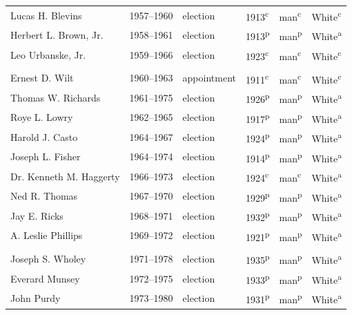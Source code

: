 \begin{longtable}{Q}
Lucas H. Blevins & 1957--1960 & election & 1913\textsuperscript{c} & man\textsuperscript{c} & White\textsuperscript{c} \\
Herbert L. Brown, Jr. & 1958--1961 & election & 1913\textsuperscript{p} & man\textsuperscript{p} & White\textsuperscript{a} \\*
Leo Urbanske, Jr. & 1959--1966 & election & 1923\textsuperscript{c} & man\textsuperscript{c} & White\textsuperscript{c} \\
\addlinespace[1.4ex]
 \\*
Ernest D. Wilt & 1960--1963 & appointment & 1911\textsuperscript{c} & man\textsuperscript{c} & White\textsuperscript{c} \\*
Thomas W. Richards & 1961--1975 & election & 1926\textsuperscript{p} & man\textsuperscript{p} & White\textsuperscript{a} \\
Roye L. Lowry & 1962--1965 & election & 1917\textsuperscript{p} & man\textsuperscript{p} & White\textsuperscript{a} \\
Harold J. Casto & 1964--1967 & election & 1924\textsuperscript{p} & man\textsuperscript{p} & White\textsuperscript{a} \\
Joseph L. Fisher & 1964--1974 & election & 1914\textsuperscript{p} & man\textsuperscript{p} & White\textsuperscript{a} \\
Dr. Kenneth M. Haggerty & 1966--1973 & election & 1924\textsuperscript{c} & man\textsuperscript{c} & White\textsuperscript{a} \\
Ned R. Thomas & 1967--1970 & election & 1929\textsuperscript{p} & man\textsuperscript{p} & White\textsuperscript{a} \\
Jay E. Ricks & 1968--1971 & election & 1932\textsuperscript{p} & man\textsuperscript{p} & White\textsuperscript{a} \\*
A. Leslie Phillips & 1969--1972 & election & 1921\textsuperscript{p} & man\textsuperscript{p} & White\textsuperscript{a} \\
\addlinespace[1.4ex]
 \\*
Joseph S. Wholey & 1971--1978 & election & 1935\textsuperscript{p} & man\textsuperscript{p} & White\textsuperscript{a} \\*
Everard Munsey & 1972--1975 & election & 1933\textsuperscript{p} & man\textsuperscript{p} & White\textsuperscript{a} \\
John Purdy & 1973--1980 & election & 1931\textsuperscript{p} & man\textsuperscript{p} & White\textsuperscript{a} \\

\end{longtable}
